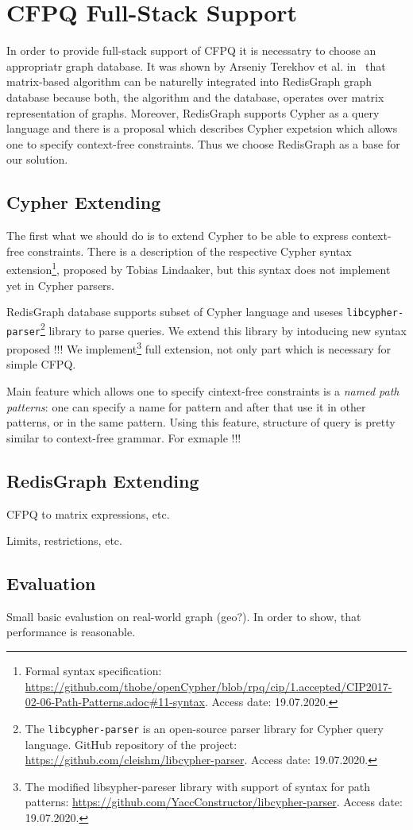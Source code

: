 \section{CFPQ Full-Stack Support}

In order to provide full-stack support of CFPQ it is necessatry to choose an appropriatr graph database.
It was shown by Arseniy Terekhov et al. in~\cite{10.1145/3398682.3399163} that matrix-based algorithm can be naturelly integrated into RedisGraph graph database because both, the algorithm and the database, operates over matrix representation of graphs.
Moreover, RedisGraph supports Cypher as a query language and there is a proposal which describes Cypher expetsion which allows one to specify context-free constraints.
Thus we choose RedisGraph as a base for our solution.  


\subsection{Cypher Extending}

The first what we should do is to extend Cypher to be able to express context-free constraints.
There is a description of the respective Cypher syntax extension\footnote{Formal syntax specification: \url{https://github.com/thobe/openCypher/blob/rpq/cip/1.accepted/CIP2017-02-06-Path-Patterns.adoc\#11-syntax}. Access date: 19.07.2020.}, proposed by Tobias Lindaaker, but this syntax does not implement yet in Cypher parsers.

RedisGraph database supports subset of Cypher language and useses \texttt{libcypher-parser}\footnote{The \texttt{libcypher-parser} is an open-source parser library for Cypher query language. GitHub repository of the project: \url{https://github.com/cleishm/libcypher-parser}. Access date: 19.07.2020.} library to parse queries.
We extend this library by intoducing new syntax proposed !!! 
We implement\footnote{The modified libsypher-pareser library with support of syntax for path patterns: \url{https://github.com/YaccConstructor/libcypher-parser}. Access date: 19.07.2020.} full extension, not only part which is necessary for simple CFPQ. 


Main feature which allows one to specify cintext-free constraints is a \textit{named path patterns}: one can specify a name for pattern and after that use it in other patterns, or in the same pattern.
Using this feature, structure of query is pretty similar to context-free grammar.
For exmaple !!!


\subsection{RedisGraph Extending}

CFPQ to matrix expressions, etc. 

Limits, restrictions, etc.

\subsection{Evaluation}

Small basic evalustion on real-world graph (geo?).
In order to show, that performance is reasonable.